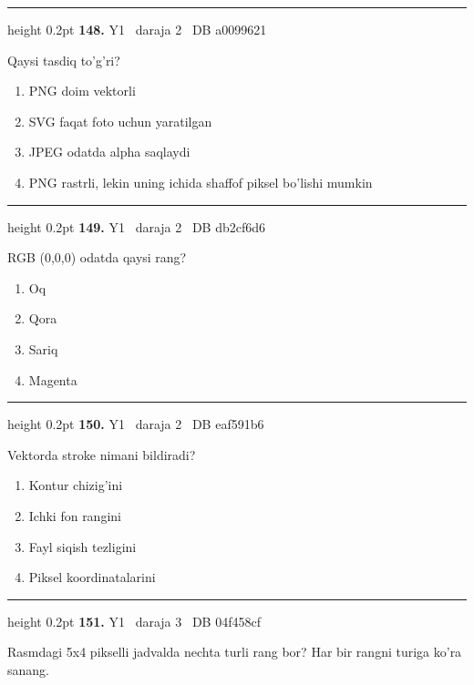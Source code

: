 \documentclass[10pt,a4paper,oneside]{article}
\begin{document}
\vspace{2mm}\hrule height 0.2pt \vspace{4mm}
\hypertarget{q148}{\textbf{\color{ink}148.}}  {\color{muted}\scriptsize Y1 \textbullet\ daraja 2 \textbullet\ DB a0099621}
\par
Qaysi tasdiq to'g'ri?
\begin{enumerate}[label=\Alph*),leftmargin=9mm]
\item PNG doim vektorli
\item SVG faqat foto uchun yaratilgan
\item JPEG odatda alpha saqlaydi
\item PNG rastrli, lekin uning ichida shaffof piksel bo'lishi mumkin
\end{enumerate}
\vspace{2mm}\hrule height 0.2pt \vspace{4mm}
\hypertarget{q149}{\textbf{\color{ink}149.}}  {\color{muted}\scriptsize Y1 \textbullet\ daraja 2 \textbullet\ DB db2cf6d6}
\par
RGB (0,0,0) odatda qaysi rang?
\begin{enumerate}[label=\Alph*),leftmargin=9mm]
\item Oq
\item Qora
\item Sariq
\item Magenta
\end{enumerate}
\vspace{2mm}\hrule height 0.2pt \vspace{4mm}
\hypertarget{q150}{\textbf{\color{ink}150.}}  {\color{muted}\scriptsize Y1 \textbullet\ daraja 2 \textbullet\ DB eaf591b6}
\par
Vektorda stroke nimani bildiradi?
\begin{enumerate}[label=\Alph*),leftmargin=9mm]
\item Kontur chizig'ini
\item Ichki fon rangini
\item Fayl siqish tezligini
\item Piksel koordinatalarini
\end{enumerate}
\vspace{2mm}\hrule height 0.2pt \vspace{4mm}
\hypertarget{q151}{\textbf{\color{ink}151.}}  {\color{muted}\scriptsize Y1 \textbullet\ daraja 3 \textbullet\ DB 04f458cf}
\par
Rasmdagi 5x4 pikselli jadvalda nechta turli rang bor? Har bir rangni turiga ko'ra sanang.
\end{document}
